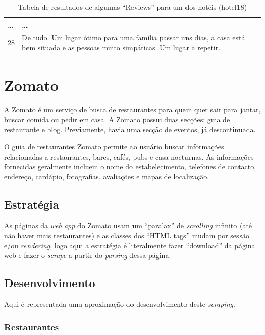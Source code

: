 \documentclass[a4paper,10pt]{article}
\begin{document}
\begin{table}[!ht]
\begin{adjustbox}{width=\columnwidth,center}
\begin{tabular}{|l|l|}
      \dots & \dots                                                                                                                                        \\ \hline
      28    & De tudo. Um lugar ótimo para uma família passar uns dias, a casa está bem situada e as pessoas muito simpáticas. Um lugar a repetir.         \\ \hline
    \end{tabular}
  \end{adjustbox}
  \caption{Tabela de resultados de algumas ``Reviews'' para um dos hotéis (hotel18)}
\end{table}

\newpage

\section{Zomato}

A Zomato é um serviço de busca de restaurantes para quem quer sair para jantar, buscar comida ou pedir em casa. A Zomato possui duas secções: guia de restaurante e blog. Previamente, havia uma secção de eventos, já descontinuada.

O guia de restaurantes Zomato permite ao usuário buscar informações relacionadas a restaurantes, bares, cafés, pubs e casa nocturnas. As informações fornecidas geralmente incluem o nome do estabelecimento, telefones de contacto, endereço, cardápio, fotografias, avaliações e mapas de localização.

\subsection{Estratégia}

As páginas da \textit{web app} do Zomato usam um ``paralax'' de \textit{scrolling} infinito (até não haver mais restaurantes) e as classes dos ``HTML tags'' mudam por sessão e/ou \textit{rendering}, logo aqui a estratégia é literalmente fazer ``download'' da página web e fazer o \textit{scrape} a partir do \textit{parsing} dessa página.

\subsection{Desenvolvimento}

Aqui é representada uma aproximação do desenvolvimento deste \textit{scraping}.

\subsubsection{Restaurantes}
\end{document}
